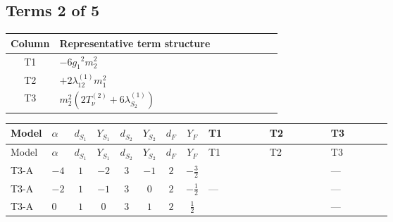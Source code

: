\documentclass[8pt]{article}
\begin{document}
\begin{landscape}
\subsection*{Terms 2 of 5}
\begin{center}
\begin{tabular}{@{}c >{\raggedright\arraybackslash}p{0.82\linewidth}@{}}
\toprule
Column & Representative term structure \\
\midrule
T1 & \(\displaystyle -6 {g_1}^2 {m_2^2}\) \\
\midrule
T2 & \(\displaystyle +2 {\lambda_{12}^{(1)}} {m_1^2}\) \\
\midrule
T3 & \(\displaystyle {m_2^2} (2 T_{\nu}^{(2)}+6 {\lambda_{S_2}^{(1)}})\) \\
\midrule
\bottomrule
\end{tabular}
\end{center}
\smallskip
\tiny
\begin{longtable}{@{}llcccccc >{\raggedright\arraybackslash}p{0.21\linewidth} >{\raggedright\arraybackslash}p{0.21\linewidth} >{\raggedright\arraybackslash}p{0.21\linewidth}@{}}
\toprule
Model & $\alpha$ & $d_{S_1}$ & $Y_{S_1}$ & $d_{S_2}$ & $Y_{S_2}$ & $d_F$ & $Y_F$ & T1 & T2 & T3 \\
\midrule
\endfirsthead
\toprule
Model & $\alpha$ & $d_{S_1}$ & $Y_{S_1}$ & $d_{S_2}$ & $Y_{S_2}$ & $d_F$ & $Y_F$ & T1 & T2 & T3 \\
\midrule
\endhead
T3-A & $-4$ & $1$ & $-2$ & $3$ & $-1$ & $2$ & $-\frac{3}{2}$ & \scriptsize\adjustbox{max width=\linewidth}{$\begin{gathered} -6 {g_1}^2 {m_2^2}\end{gathered}$} & \scriptsize\adjustbox{max width=\linewidth}{$\begin{gathered} +2 {\lambda_{12}^{(1)}} {m_1^2}\end{gathered}$} & --- \\
\midrule
T3-A & $-2$ & $1$ & $-1$ & $3$ & $0$ & $2$ & $-\frac{1}{2}$ & --- & \scriptsize\adjustbox{max width=\linewidth}{$\begin{gathered} +2 {\lambda_{12}^{(1)}} {m_1^2}\end{gathered}$} & --- \\
\midrule
T3-A & $0$ & $1$ & $0$ & $3$ & $1$ & $2$ & $\frac{1}{2}$ & \scriptsize\adjustbox{max width=\linewidth}{$\begin{gathered} -6 {g_1}^2 {m_2^2}\end{gathered}$} & \scriptsize\adjustbox{max width=\linewidth}{$\begin{gathered} +2 {\lambda_{12}^{(1)}} {m_1^2}\end{gathered}$} & --- \\

\end{longtable}
\end{landscape}
\end{document}
